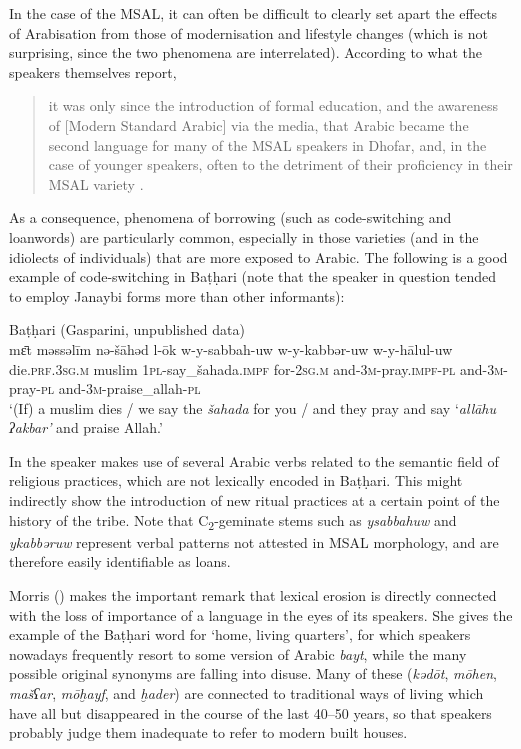 \documentclass[output=paper]{langsci/langscibook}
\begin{document}
In the case of the MSAL, it can often be difficult to clearly set apart the effects of Arabisation from those of modernisation and lifestyle changes (which is not surprising, since the two phenomena are interrelated). According to what the speakers themselves report, 

\begin{quote}
{it was only since the introduction of formal education, and the awareness of} [Modern Standard Arabic] via the media, that Arabic became the second language for many of the MSAL speakers in Dhofar, and, in the case of younger speakers, often to the detriment of their proficiency in their MSAL variety \citep[11]{Davey2016}.
\end{quote}

As a consequence, phenomena of borrowing (such as code-switching and loanwords) are particularly common, especially in those varieties (and in the idiolects of individuals) that are more exposed to Arabic. The following is a good example of code-switching in Baṭḥari (note that the speaker in question tended to employ Janaybi forms more than other informants):

\ea\label{ex:key:allah}
{Baṭḥari (Gasparini, unpublished data)}\\
\gll mɛ̄t məssəlīm nə-šāhəd l-ōk w-y-sabbah-uw w-y-kabbər-uw w-y-hālul-uw\\
     die.\textsc{prf.3sg.m} muslim \textsc{1pl-}say\_šahada.\textsc{impf} for-\textsc{2sg.m} and-\textsc{3m-}pray.\textsc{impf-pl} and-3\textsc{m}-pray-\textsc{pl} and-\textsc{3m-}praise\_allah-\textsc{pl}\\
\glt `(If) a muslim dies / we say the \textit{šahada} for you / and they pray and say ‘\textit{allāhu} \textit{ʔakbar’} and praise Allah.'
\z

In  the speaker makes use of several Arabic verbs related to the semantic field of religious practices, which are not lexically encoded in Baṭḥari. This might indirectly show the introduction of new ritual practices at a certain point of the history of the tribe. Note that C\textsubscript{2}-geminate stems such as \textit{ysabbahuw} and \mbox{\textit{ykabbəruw}} represent verbal patterns not attested in MSAL morphology, and are therefore easily identifiable as loans.

Morris (\citeyear[15]{Morris2017}) makes the important remark that lexical erosion is directly connected with the loss of importance of a language in the eyes of its speakers. She gives the example of the Baṭḥari word for ‘home, living quarters’, for which speakers nowadays frequently resort to some version of Arabic \textit{bayt}, while the many possible original synonyms are falling into disuse. Many of these (\textit{kədōt}, \textit{mōhen}, \textit{mašʕar}, \textit{mōḫayf}, and \textit{ḫader}) are connected to traditional ways of living which have all but disappeared in the course of the last 40--50 years, so that speakers probably judge them inadequate to refer to modern built houses. 
\end{document}
